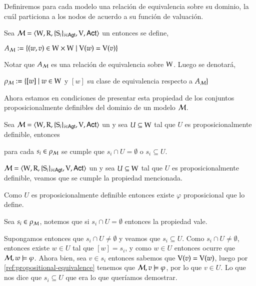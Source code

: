 Definiremos para cada modelo una relación de equivalencia sobre su dominio, la cuál particiona a los nodos de acuerdo
a su función de valuación.

\begin{definicion}
    Sea $\mathcal{M}=\langle \mathrm{W},\mathrm{R},\{ \mathrm{S}_i \}_{i \in {\rm \sf Agt}},\mathrm{V},{\rm \sf Act} \rangle$ un \ults entonces se define, 
    \begin{center}
        $A_{\mathcal{M}} := \{(w,v) \in \mathrm{W} \times \mathrm{W} \mid \mathrm{V}(w) = \mathrm{V}(v)\}$
    \end{center}
    Notar que $A_{\mathcal{M}}$ es una relación de equivalencia sobre $\mathrm{W}$. Luego se denotará,
    \begin{center}
        $\rho_{\mathcal{M}} := \{ [w] \mid w \in \mathrm{W} $ y $[w]$ su clase de equivalencia respecto a $A_{\mathcal{M}}\}$
    \end{center}
\end{definicion}

Ahora estamos en condiciones de presentar esta propiedad de los conjuntos proposicionalmente definibles del dominio de un modelo $\mathcal{M}$.

\begin{lema}\label{ref:propositionally-definable-lemma}
    Sea $\mathcal{M}=\langle \mathrm{W},\mathrm{R},\{ \mathrm{S}_i \}_{i \in {\rm \sf Agt}},\mathrm{V},{\rm \sf Act} \rangle$ un \ults y sea $U \subseteq \mathrm{W}$ tal que $U$ es proposicionalmente definible, entonces
    \begin{center}
        para cada $s_i \in \rho_{\mathcal{M}}$ se cumple que $s_i \cap U = \emptyset$ o $s_i \subseteq U$.
    \end{center}
\end{lema}

\begin{demostracion}
    $\mathcal{M}=\langle \mathrm{W},\mathrm{R},\{ \mathrm{S}_i \}_{i \in {\rm \sf Agt}},\mathrm{V},{\rm \sf Act} \rangle$ un \ults y sea $U \subseteq \mathrm{W}$ tal que $U$ es proposicionalmente definible, 
    veamos que se cumple la propiedad mencionada.

    Como $U$ es proposicionalmente definible entonces existe $\varphi$ proposicional que lo define.

    Sea $s_i \in \rho_{\mathcal{M}}$, notemos que si $s_i \cap U = \emptyset$ entonces la propiedad vale.
    
    Supongamos entonces que $s_i \cap U \neq \emptyset$ y veamos que $s_i \subseteq U$. Como $s_i \cap U \neq \emptyset$, entonces existe 
    $w \in U$ tal que $[w] = s_i$, y como $w \in U$ entonces ocurre que $\mathcal{M},w \models \varphi$. Ahora bien, sea $v \in s_i$ 
    entonces sabemos que $\mathrm{V}(v) = \mathrm{V}(w)$, luego por \ref{ref:propositional-equivalence} tenemos que $\mathcal{M},v \models \varphi$, por 
    lo que $v \in U$. Lo que nos dice que $s_i \subseteq U$ que era lo que queríamos demostrar.  
\end{demostracion}

